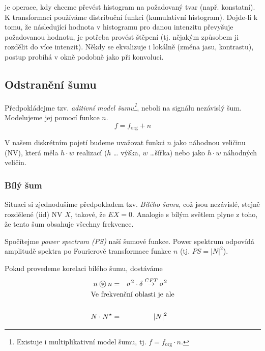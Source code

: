 
 je operace, kdy chceme převést histogram na požadovaný tvar (např. konstatní). K transformaci 
používáme distribuční funkci (kumulativní histogram). Dojde-li k tomu, že následující hodnota v histogramu pro 
danou intenzitu převyšuje požadovanou hodnotu, je potřeba provést štěpení (tj. nějakým způsobem ji rozdělit
do více intenzit). Někdy se ekvalizuje i lokálně (změna jasu, kontrastu), postup probíhá v okně podobně jako při konvoluci.


\subsection{Odstranění šumu}

Předpokládejme tzv. {\em aditivní model šumu\footnote{Existuje i multiplikativní model šumu, tj. $f=f_{\mathrm{org}}\cdot n$.}}, neboli na signálu nezávislý šum. Modelujeme jej pomocí funkce $n$.
\begin{equation}
f=f_{\mathrm{org}}+n
\end{equation}

V našem diskrétním pojetí budeme uvažovat funkci $n$ jako náhodnou veličinu (NV), která měla $h\cdot w$ realizací ($h$ \dots
výška, $w$ \dots šířka) nebo jako $h\cdot w$ náhodných veličin. 

\subsubsection{Bílý šum}

Situaci si zjednodušíme předpokladem tzv. {\em Bílého šumu}, což jsou nezávislé, stejně rozdělené (iid) NV $X$, takové, že $EX=0$.
Analogie s bílým světlem plyne z toho, že tento šum obsahuje všechny frekvence. 

Spočítejme {\em power spectrum (PS)} naší
šumové funkce. Power spektrum odpovídá amplitudě spektra po Fourierově transformace funkce $n$ (tj. $PS=|N|^2$).
 
Pokud provedeme korelaci bílého šumu, dostáváme
\begin{eqnarray}
n\corr n&=&\sigma^2\cdot \delta\stackrel{CFT}{\rightarrow}\sigma^2\label{korel}\\
\noalign{\hbox{Ve frekvenční oblasti je ale}\nonumber}\\
N\cdot N^\star&=&|N|^2
\end{eqnarray}

